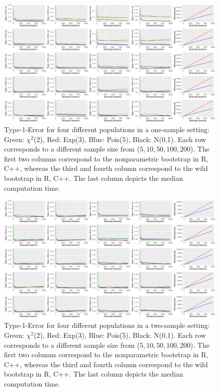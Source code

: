 \begin{figure}
\centering
	\includegraphics[scale=0.4]{./figures/plot_t1s1.pdf}
	\caption[Type-I-Error One Sample]{Type-1-Error for four different populations in a one-sample setting: Green: $\chi^2$(2), Red: Exp(3), Blue: Pois(5), Black: N(0,1). Each row corresponds to a different sample size from ($5, 10, 50, 100, 200$). The first two columns correspond to the nonparametric bootstrap in R, C++, whereas the third and fourth column correspond to the wild bootstrap in R, C++. The last column depicts the median computation time.}
	\label{fig:t1_s1}
\end{figure}


\begin{figure}
\centering
	\includegraphics[scale=0.4]{./figures/plot_t1s2.pdf}
	\caption[Type-I-Error Two Sample]{Type-1-Error for four different populations in a two-sample setting: Green: $\chi^2$(2), Red: Exp(3), Blue: Pois(5), Black: N(0,1). Each row corresponds to a different sample size from ($5, 10, 50, 100, 200$). The first two columns correspond to the nonparametric bootstrap in R, C++, whereas the third and fourth column correspond to the wild bootstrap in R, C++. The last column depicts the median computation time.}
	\label{fig:t1_s2}
\end{figure}

